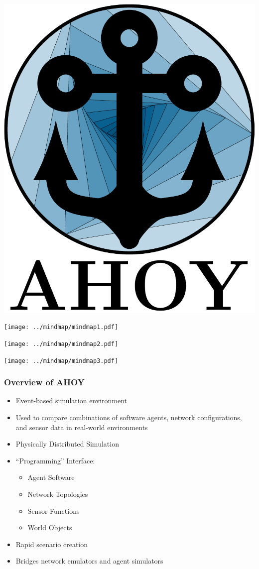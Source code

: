 \documentclass[mathserif,usenames,dvipsnames]{beamer}
\begin{document}
\frame
{
    \begin{center}
        \includegraphics[scale=.4]{../common/logo.pdf}
    \end{center}
}
\frame
{
    \begin{center}
        \texttt{[image: ../mindmap/mindmap1.pdf]}
    \end{center}
}
\frame
{
    \begin{center}
        \texttt{[image: ../mindmap/mindmap2.pdf]}
    \end{center}
}
\frame
{
    \begin{center}
        \texttt{[image: ../mindmap/mindmap3.pdf]}
    \end{center}
}

\frame
{
    \frametitle{Overview of AHOY}
    \begin{itemize}
	\item Event-based simulation environment
	\item Used to compare combinations of software agents, network configurations, and sensor data in real-world environments
	\item Physically Distributed Simulation
	\item ``Programming'' Interface:
	\begin{itemize}
	    \item Agent Software
	    \item Network Topologies
	    \item Sensor Functions
	    \item World Objects
	\end{itemize}
	\item Rapid scenario creation
	\item Bridges network emulators and agent simulators
    \end{itemize}
}
\end{document}
